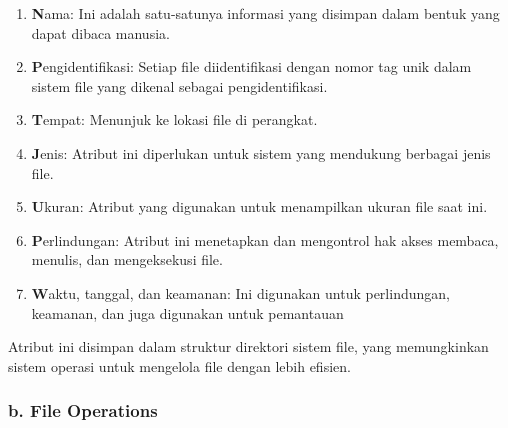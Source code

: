 \documentclass[12pt]{article}
\begin{document}
\begin{enumerate}
    \item \textbf Nama: Ini adalah satu-satunya informasi yang disimpan dalam bentuk yang dapat dibaca manusia.
    \item \textbf Pengidentifikasi: Setiap file diidentifikasi dengan nomor tag unik dalam sistem file yang dikenal sebagai pengidentifikasi.
    \item \textbf Tempat: Menunjuk ke lokasi file di perangkat.	
    \item \textbf Jenis: Atribut ini diperlukan untuk sistem yang mendukung berbagai jenis file.
    \item \textbf Ukuran: Atribut yang digunakan untuk menampilkan ukuran file saat ini.	
    \item \textbf Perlindungan: Atribut ini menetapkan dan mengontrol hak akses membaca, menulis, dan mengeksekusi file.
    \item \textbf Waktu, tanggal, dan keamanan: Ini digunakan untuk perlindungan, keamanan, dan juga digunakan untuk pemantauan
\end{enumerate}

Atribut ini disimpan dalam struktur direktori sistem file, yang memungkinkan sistem operasi untuk mengelola file dengan lebih efisien.

\subsubsection*{b. File Operations}
\end{document}
